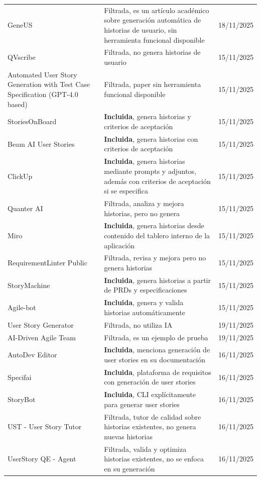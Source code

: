 \begin{center}
\begin{longtable}{|p{6.5cm}|p{4cm}|p{1.8cm}|}
GeneUS & Filtrada, es un artículo académico sobre generación automática de historias de usuario, sin herramienta funcional disponible & 18/11/2025 \\
QVscribe & Filtrada, no genera historias de usuario & 15/11/2025 \\
Automated User Story Generation with Test Case Specification (GPT-4.0 based) & Filtrada, paper sin herramienta funcional disponible & 15/11/2025 \\
StoriesOnBoard & \textbf{Incluida}, genera historias y criterios de aceptación & 15/11/2025 \\
Beam AI User Stories & \textbf{Incluida}, genera historias con criterios de aceptación & 15/11/2025 \\
ClickUp & \textbf{Incluida}, genera historias mediante prompts y adjuntos, además con criterios de aceptación si se especifica & 15/11/2025 \\
Quanter AI & Filtrada, analiza y mejora historias, pero no genera & 15/11/2025 \\
Miro & \textbf{Incluida}, genera historias desde contenido del tablero interno de la aplicación & 15/11/2025 \\
RequirementLinter Public & Filtrada, revisa y mejora pero no genera historias & 15/11/2025 \\
StoryMachine & \textbf{Incluida}, genera historias a partir de PRDs y especificaciones & 15/11/2025 \\
Agile-bot & \textbf{Incluida}, genera y valida historias automáticamente & 15/11/2025 \\
User Story Generator & Filtrada, no utiliza IA & 19/11/2025 \\
AI-Driven Agile Team & Filtrada, es un ejemplo de prueba & 19/11/2025 \\
AutoDev Editor & \textbf{Incluida}, menciona generación de user stories en su documentación & 16/11/2025 \\
Specifai & \textbf{Incluida}, plataforma de requisitos con generación de user stories & 16/11/2025 \\
StoryBot & \textbf{Incluida}, CLI explícitamente para generar user stories & 16/11/2025 \\
UST - User Story Tutor & Filtrada, tutor de calidad sobre historias existentes, no genera nuevas historias & 16/11/2025 \\
UserStory QE - Agent & Filtrada, valida y optimiza historias existentes, no se enfoca en su generación & 16/11/2025 \\

\end{longtable}
\end{center}
